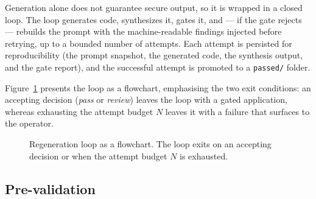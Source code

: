 Generation alone does not guarantee secure output, so it is wrapped in a closed loop.
The loop generates code, synthesizes it, gates it, and --- if the gate rejects ---
rebuilds the prompt with the machine-readable findings injected before retrying, up to a
bounded number of attempts. Each attempt is persisted for reproducibility (the prompt snapshot, the generated
code, the synthesis output, and the gate report), and the successful attempt is promoted
to a \texttt{passed/} folder.

Figure~\ref{fig:method-regen} presents the loop as a flowchart, emphasising the two
exit conditions: an accepting decision (\emph{pass} or \emph{review}) leaves the loop
with a gated application, whereas exhausting the attempt budget $N$ leaves it with a
failure that surfaces to the operator.

\begin{figure}[ht]
\centering
{}
\caption{Regeneration loop as a flowchart. The loop exits on an accepting decision or
when the attempt budget $N$ is exhausted.}
\label{fig:method-regen}
\end{figure}

\subsection{Pre-validation}
\label{subsec:method-prevalidation}

